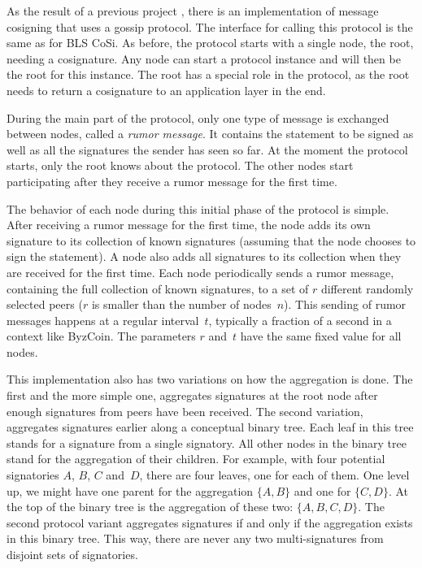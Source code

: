 As the result of a previous project \cite{ProjExisting}, there is an implementation of message cosigning that uses a gossip protocol. The interface for calling this protocol is the same as for BLS CoSi. As before, the protocol starts with a single node, the root, needing a cosignature. Any node can start a protocol instance and will then be the root for this instance. The root has a special role in the protocol, as the root needs to return a cosignature to an application layer in the end.

During the main part of the protocol, only one type of message is exchanged between nodes, called a \emph{rumor message}. It contains the statement to be signed as well as all the signatures the sender has seen so far.
At the moment the protocol starts, only the root knows about the protocol.
The other nodes start participating after they receive a rumor message for the first time.

The behavior of each node during this initial phase of the protocol is simple.
After receiving a rumor message for the first time, the node adds its own signature to its collection of known signatures (assuming that the node chooses to sign the statement).
A node also adds all signatures to its collection when they are received for the first time.
Each node periodically sends a rumor message, containing the full collection of known signatures, to a set of $r$ different randomly selected peers ($r$ is smaller than the number of nodes~$n$).
This sending of rumor messages happens at a regular interval~$t$, typically a fraction of a second in a context like ByzCoin.
The parameters $r$ and~$t$ have the same fixed value for all nodes.

This implementation also has two variations on how the aggregation is done. The first and the more simple one, aggregates signatures at the root node after enough signatures from peers have been received. The second variation, aggregates signatures earlier along a conceptual binary tree.
Each leaf in this tree stands for a signature from a single signatory.
All other nodes in the binary tree stand for the aggregation of their children.
For example, with four potential signatories $A$, $B$, $C$ and~$D$, there are four leaves, one for each of them.
One level up, we might have one parent for the aggregation $\{A, B\}$ and one for $\{C, D\}$.
At the top of the binary tree is the aggregation of these two: $\{A, B, C, D\}$.
The second protocol variant aggregates signatures if and only if the aggregation exists in this binary tree.
This way, there are never any two multi-signatures from disjoint sets of signatories.

